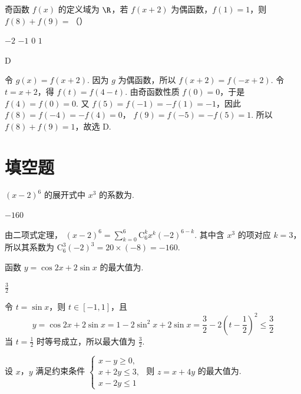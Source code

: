 \begin{problem}
奇函数 \( f(x) \) 的定义域为 \( \R \)，若 \( f(x + 2) \) 为偶函数，\( f(1) = 1 \)，则 \( f(8) + f(9) = \)（\quad）

\choices
    {\(-2\)}
    {\(-1\)}
    {\(0\)}
    {\(1\)}
\end{problem}

\begin{answer}
D
\end{answer}

\begin{solution}
令 \(g(x)=f(x+2)\). 因为 \(g\) 为偶函数，所以
\(f(x+2)=f(-x+2)\). 令 \(t=x+2\)，得
\(f(t)=f(4-t)\). 由奇函数性质 \(f(0)=0\)，于是
\(f(4)=f(0)=0\). 又
\(f(5)=f(-1)=-f(1)=-1\)，因此
\(f(8)=f(-4)=-f(4)=0\)，
\(f(9)=f(-5)=-f(5)=1\). 所以 \(f(8)+f(9)=1\)，故选 D.
\end{solution}

\section{填空题}

\begin{problem}
\((x - 2)^{6}\) 的展开式中 \(x^{3}\) 的系数为\fillinblank{}.
\end{problem}

\begin{answer}
\(-160\)
\end{answer}

\begin{solution}
由二项式定理，
\((x-2)^6=\sum_{k=0}^{6}\mathrm C_6^k x^k(-2)^{6-k}\). 其中含 \(x^3\) 的项对应 \(k=3\)，所以其系数为
\(\mathrm C_6^3(-2)^3=20\times(-8)=-160\).
\end{solution}

\begin{problem}
函数 \( y = \cos 2x + 2\sin x \) 的最大值为\fillinblank{}.
\end{problem}

\begin{answer}
\(\frac{3}{2}\)
\end{answer}

\begin{solution}
令 \(t=\sin x\)，则 \(t\in[-1,1]\)，且
\[
y=\cos2x+2\sin x=1-2\sin^2x+2\sin x
=\frac{3}{2}-2\left(t-\frac{1}{2}\right)^2\leqslant\frac{3}{2}
\]
当 \(t=\frac{1}{2}\) 时等号成立，所以最大值为 \(\frac{3}{2}\).
\end{solution}

\begin{problem}
设 \(x\)，\(y\) 满足约束条件 \(
\begin{cases}
x - y \geqslant 0, \\
x + 2y \leqslant 3, \\
x - 2y \leqslant 1
\end{cases}
\) 则 \(z = x + 4y\) 的最大值为\fillinblank{}.
\end{problem}

